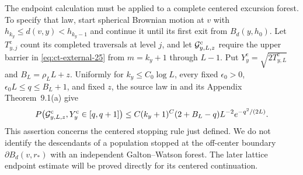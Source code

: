 The endpoint calculation must be applied to a complete centered excursion
forest.  To specify that law, start spherical Brownian motion at $v$ with
$h_{k_y}\le d(v,y)<h_{k_y-1}$ and continue it until its first exit from
$B_d(y,h_0)$.  Let $T^{\mathrm c}_{y,j}$ count its completed traversals
at level $j$, and let ${\cal G}^{\mathrm c}_{y,L,z}$ require the upper
barrier in \eqref{eq:ct-external-25} from $m=k_y+1$ through $L-1$.
Put $Y_y^{\mathrm c}=\sqrt{2T^{\mathrm c}_{y,L}}$ and
$B_L=\rho_LL+z$.  Uniformly for
$k_y\le C_0\log L$, every fixed $\epsilon_0>0$,
$\epsilon_0L\le q\le B_L+1$, and fixed $z$, the source law in
\cite[(2.8)]{Rosen2022} and its Appendix Theorem~9.1(a) give
\begin{equation}
P\big({\cal G}^{\mathrm c}_{y,L,z},Y_y^{\mathrm c}\in[q,q+1]\big)
 \le C(k_y+1)^C(2+B_L-q)L^{-2}e^{-q^2/(2L)}.\label{eq:ct-external-29}
\end{equation}
This assertion concerns the centered stopping rule just defined.  We do not
identify the descendants of a population stopped at the off-center boundary
$\partial B_d(v,r_*)$ with an independent Galton--Watson forest.
The later lattice endpoint estimate will be proved directly for its centered
continuation.

